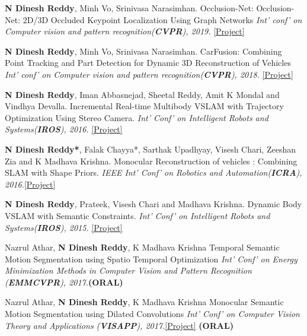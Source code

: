 \documentclass[7pt]{article}
\begin{document}
\begin{small}
\vspace{-1 mm}
\textbf{N Dinesh Reddy}, Minh Vo, Srinivasa Narasimhan. Occlusion-Net: Occlusion-Net: 2D/3D Occluded Keypoint Localization Using Graph Networks {\sl Int' conf' on Computer vision and pattern recognition(\textbf{CVPR}), 2019.} 
\href{http://www.cs.cmu.edu/~ILIM/projects/IM/CarFusion/cvpr2019/index.html}{[Project]}

\textbf{N Dinesh Reddy}, Minh Vo, Srinivasa Narasimhan. CarFusion: Combining Point Tracking and Part Detection for Dynamic 3D Reconstruction of Vehicles {\sl Int' conf' on Computer vision and pattern recognition(\textbf{CVPR}), 2018.}
\href{http://www.cs.cmu.edu/~ILIM/projects/IM/CarFusion/}{[Project]}

\textbf{N Dinesh Reddy}, Iman Abbasnejad, Sheetal Reddy, Amit K Mondal and Vindhya Devalla. Incremental Real-time Multibody VSLAM with Trajectory Optimization Using Stereo Camera. {\sl Int' Conf' on Intelligent Robots and Systems(\textbf{IROS}), 2016.} \href{http://ieeexplore.ieee.org/document/7759663/}{[Project]}



\textbf{N Dinesh Reddy*}, Falak Chayya*, Sarthak Upadhyay, Visesh Chari, Zeeshan Zia and K Madhava Krishna. Monocular Reconstruction of vehicles : Combining SLAM with Shape Priors. {\sl IEEE Int' Conf' on Robotics and Automation(\textbf{ICRA}), 2016.}\href{http://robotics.iiit.ac.in/people/falak.chhaya/Monocular_Reconstruction_of_Vehicles.html}{[Project]}


\textbf{N Dinesh Reddy}, Prateek, Visesh Chari and Madhava Krishna. Dynamic Body VSLAM with Semantic Constraints. {\sl Int' Conf' on Intelligent Robots and Systems(\textbf{IROS}), 2015.} \href{https://researchweb.iiit.ac.in/~dineshreddy.n/zerotype/projects/DB-VSLAM/}{[Project]}

Nazrul Athar, \textbf{N Dinesh Reddy}, K Madhava Krishna Temporal Semantic Motion Segmentation using Spatio Temporal Optimization {\sl Int' Conf' on Energy Minimization Methods in Computer Vision and Pattern Recognition (\textbf{EMMCVPR}), 2017.}\textbf{(ORAL)} 

Nazrul Athar, \textbf{N Dinesh Reddy}, K Madhava Krishna Monocular Semantic Motion Segmentation using Dilated
Convolutions {\sl Int' Conf' on Computer Vision Theory and Applications (\textbf{VISAPP}), 2017.}\href{http://robotics.iiit.ac.in/people/nazrul.athar/SMS/} {[Project]} \textbf{(ORAL)} 


\end{small}
\end{document}
